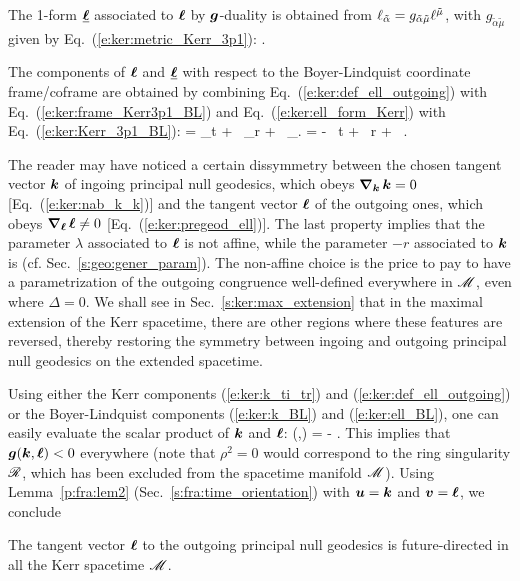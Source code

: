 The 1-form $\underline{\bm{\ell}}$ associated to $\bm{\ell}$ by
$\bm{g}$-duality is obtained
from $\ell_{\tilde{\alpha}} = g_{\tilde{\alpha}\tilde{\mu}} \ell^{\tilde{\mu}}$, with
$g_{\tilde{\alpha}\tilde{\mu}}$ given by Eq.~(\ref{e:ker:metric_Kerr_3p1}):
\be \label{e:ker:ell_form_Kerr}
     .
\ee

The components of $\bm{\ell}$ and $\underline{\bm{\ell}}$ with respect to the Boyer-Lindquist coordinate frame/coframe
are obtained by combining Eq.~(\ref{e:ker:def_ell_outgoing}) with Eq.~(\ref{e:ker:frame_Kerr3p1_BL})
and Eq.~(\ref{e:ker:ell_form_Kerr}) with Eq.~(\ref{e:ker:Kerr_3p1_BL}):
\be \label{e:ker:ell_BL}
    \wl =  \wpar_t + \, \wpar_r
    + \, \wpar_\ph .
\ee
\be \label{e:ker:ell_form_BL}
    \uu{\el} = - \, \dd t
     + \,  \dd r
     +  \, \dd \ph .
\ee


\begin{remark} \label{r:ker:k_versus_l}
The reader may have noticed a certain dissymmetry between the chosen tangent vector
$\bm{k}$ of ingoing principal null geodesics, which obeys $\bm{\nabla}_{\bm{k}}\, \bm{k} = 0$
[Eq.~(\ref{e:ker:nab_k_k})] and the tangent vector $\bm{\ell}$ of the outgoing
ones, which obeys $\bm{\nabla}_{\bm{\ell}}\, \bm{\ell} \not= 0$ [Eq.~(\ref{e:ker:pregeod_ell})].
The last property implies that the
parameter $\lambda$ associated to $\bm{\ell}$ is not affine, while the
parameter $-r$ associated to $\bm{k}$ is (cf. Sec.~\ref{s:geo:gener_param}).
The non-affine choice is the price to pay to have a parametrization of the outgoing
congruence well-defined everywhere in $\mathscr{M}$, even where $\Delta=0$. We shall see in
Sec.~\ref{s:ker:max_extension} that in the maximal extension of the Kerr spacetime, there are other regions where these features are reversed,
thereby restoring the symmetry between ingoing and outgoing principal null geodesics
on the extended spacetime.
\end{remark}


Using either the Kerr components (\ref{e:ker:k_ti_tr}) and
(\ref{e:ker:def_ell_outgoing})
or the Boyer-Lindquist components (\ref{e:ker:k_BL}) and (\ref{e:ker:ell_BL}),
one can easily evaluate the scalar product of $\bm{k}$ and $\bm{\ell}$:
\be \label{e:ker:k_scal_ell}
    (,\wl) = -  .
\ee
This implies that $\bm{g}(\bm{k},\bm{\ell}) < 0$ everywhere (note that $\rho^2= 0$
would correspond to the ring singularity $\mathscr{R}$, which has been excluded from
the spacetime manifold $\mathscr{M}$).
Using Lemma~\ref{p:fra:lem2} (Sec.~\ref{s:fra:time_orientation}) with $\bm{u}=\bm{k}$ and
$\bm{v} = \bm{\ell}$, we conclude
\begin{prop}
The tangent vector $\bm{\ell}$ to the outgoing principal null geodesics
is future-directed in all the Kerr spacetime $\mathscr{M}$.
\end{prop}

